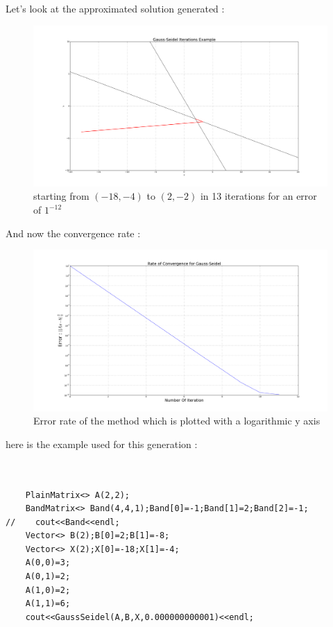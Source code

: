\documentclass[a4paper]{report}
\begin{document}
Let's look at the approximated solution generated :
\begin{figure}[H]
\begin{center}
\includegraphics[scale=0.20]{gauss_seidel_iteration.png}\caption{starting from $(-18,-4)$ to $(2,-2)$ in 13 iterations for an error of $1^{-12}$}
\end{center}
\end{figure}
And now the convergence rate :

\begin{figure}[H]
\begin{center}
\includegraphics[scale=0.20]{gauss_seidel_rate.png}\caption{Error rate of the method which is plotted with a logarithmic y axis}
\end{center}
\end{figure}
here is the example used for this generation :
\begin{lstlisting}[basicstyle=\tiny]


    PlainMatrix<> A(2,2);
    BandMatrix<> Band(4,4,1);Band[0]=-1;Band[1]=2;Band[2]=-1;
//    cout<<Band<<endl;
    Vector<> B(2);B[0]=2;B[1]=-8;
    Vector<> X(2);X[0]=-18;X[1]=-4;
    A(0,0)=3;
    A(0,1)=2;
    A(1,0)=2;
    A(1,1)=6;
    cout<<GaussSeidel(A,B,X,0.000000000001)<<endl;


\end{lstlisting}
\end{document}
